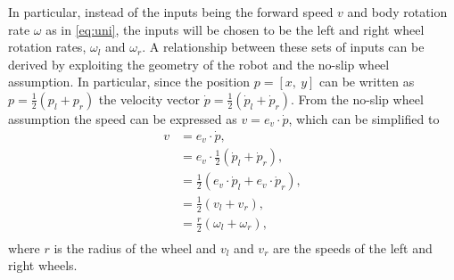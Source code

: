 In particular, instead of the inputs being the forward speed $v$ and body rotation rate $\omega$ as in \eqref{eq:uni}, the inputs will be chosen to be the left and right wheel rotation rates, $\omega_l$ and $\omega_r$. A relationship between these sets of inputs can be derived by exploiting the geometry of the robot and the no-slip wheel assumption. In particular, since the position $p = [x, \: y]$ can be written as $p = \frac{1}{2}(p_l + p_r)$ the velocity vector $\dot{p} = \frac{1}{2}(\dot{p}_l + \dot{p}_r)$. From the no-slip wheel assumption the speed can be expressed as $v = e_v \cdot \dot{p}$, which can be simplified to
\begin{equation*}
\begin{split}
v &= e_v \cdot \dot{p}, \\
&= e_v \cdot \frac{1}{2}(\dot{p}_l + \dot{p}_r), \\
&= \frac{1}{2}(e_v \cdot \dot{p}_l + e_v \cdot \dot{p}_r), \\
&= \frac{1}{2}(v_l + v_r), \\
&= \frac{r}{2}(\omega_l + \omega_r), \\
\end{split}
\end{equation*}
where $r$ is the radius of the wheel and $v_l$ and $v_r$ are the speeds of the left and right wheels. 

